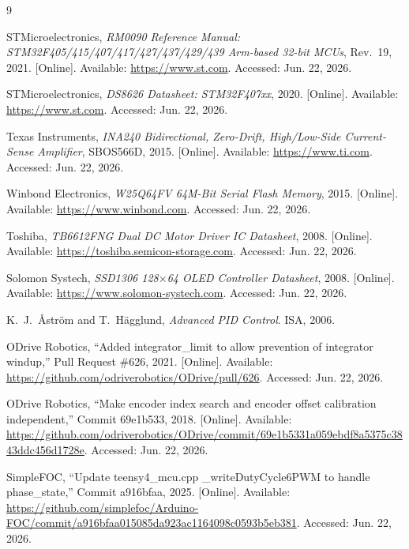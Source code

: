 \documentclass[12pt, a4paper]{report}
\begin{document}
\begin{thebibliography}{9}

  STMicroelectronics, \textit{RM0090 Reference Manual: STM32F405/415/407/417/427/437/429/439 Arm-based 32-bit MCUs}, Rev.~19, 2021.
  [Online]. Available: \url{https://www.st.com}. Accessed: Jun. 22, 2026.

  STMicroelectronics, \textit{DS8626 Datasheet: STM32F407xx}, 2020.
  [Online]. Available: \url{https://www.st.com}. Accessed: Jun. 22, 2026.

  Texas Instruments, \textit{INA240 Bidirectional, Zero-Drift, High/Low-Side Current-Sense Amplifier}, SBOS566D, 2015.
  [Online]. Available: \url{https://www.ti.com}. Accessed: Jun. 22, 2026.

  Winbond Electronics, \textit{W25Q64FV 64M-Bit Serial Flash Memory}, 2015.
  [Online]. Available: \url{https://www.winbond.com}. Accessed: Jun. 22, 2026.

  Toshiba, \textit{TB6612FNG Dual DC Motor Driver IC Datasheet}, 2008.
  [Online]. Available: \url{https://toshiba.semicon-storage.com}. Accessed: Jun. 22, 2026.

  Solomon Systech, \textit{SSD1306 128$\times$64 OLED Controller Datasheet}, 2008.
  [Online]. Available: \url{https://www.solomon-systech.com}. Accessed: Jun. 22, 2026.

  K.~J.\ {\AA}str\"om and T.\ H\"agglund,
  \textit{Advanced PID Control}.
  ISA, 2006.

  ODrive Robotics, ``Added integrator\_limit to allow prevention of integrator windup,''
  Pull Request \#626, 2021.
  [Online]. Available: \url{https://github.com/odriverobotics/ODrive/pull/626}. Accessed: Jun. 22, 2026.

  ODrive Robotics, ``Make encoder index search and encoder offset calibration independent,''
  Commit 69e1b533, 2018.
  [Online]. Available: \url{https://github.com/odriverobotics/ODrive/commit/69e1b5331a059ebdf8a5375c3843ddc456d1728e}. Accessed: Jun. 22, 2026.

  SimpleFOC, ``Update teensy4\_mcu.cpp \_writeDutyCycle6PWM to handle phase\_state,''
  Commit a916bfaa, 2025.
  [Online]. Available: \url{https://github.com/simplefoc/Arduino-FOC/commit/a916bfaa015085da923ac1164098c0593b5eb381}. Accessed: Jun. 22, 2026.

\end{thebibliography}
\end{document}
